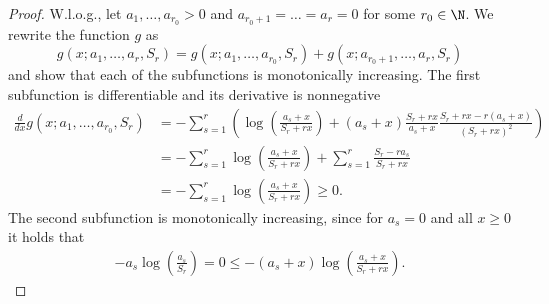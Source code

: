 \begin{proof}
W.l.o.g., let $a_1,\ldots,a_{r_0}>0$ and $a_{r_0+1}=\ldots=a_r=0$ for some $r_0\in \N$. We rewrite the function $g$ as
\[g(x;a_1,\ldots,a_r,S_r)=g(x;a_1,\ldots,a_{r_0},S_r)+g(x;a_{r_0+1},\ldots,a_r,S_r)\]
and show that each of  the subfunctions is monotonically increasing.
The first subfunction is differentiable and its derivative is nonnegative
\begin{align*}
\frac{d}{dx}g(x;a_1,\ldots,a_{r_0},S_r) &= -\sum_{s=1}^r\left(\log\left(\frac{a_s+x}{S_r+rx}\right)+(a_s+x)\frac{S_r+rx}{a_s+x}\frac{S_r+rx-r(a_s+x)}{(S_r+rx)^2}\right)\\
&= -\sum_{s=1}^r\log\left(\frac{a_s+x}{S_r+rx}\right)+\sum_{s=1}^r\frac{S_r-ra_s}{S_r+rx}\\
&= -\sum_{s=1}^r\log\left(\frac{a_s+x}{S_r+rx}\right)\geq 0.
\end{align*}
The second subfunction is monotonically increasing, since for $a_s=0$ and all $x\geq 0$ it holds that
\begin{align*}
	-a_s\log\left(\frac{a_s}{S_r}\right)=0\leq -(a_s+x)\log\left(\frac{a_s+x}{S_r+rx}\right).
\end{align*}
\end{proof}
\BoundLCT*
